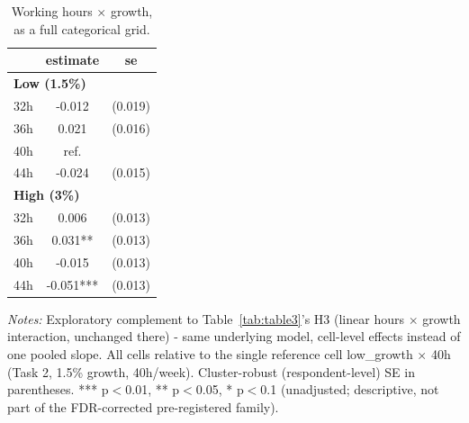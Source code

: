 \begin{table}[H]
    \centering
    \caption{Working hours $\times$ growth, as a full categorical grid.}
    \begin{tabular}{ l c c }
\hline \hline
 & estimate & se \\
\hline
\multicolumn{3}{l}{\textbf{Low (1.5\%)}} \\
\hspace{0.05cm} 32h & -0.012 & (0.019) \\
\hspace{0.05cm} 36h & 0.021 & (0.016) \\
\hspace{0.05cm} 40h & ref. &  \\
\hspace{0.05cm} 44h & -0.024 & (0.015) \\
\hline
\multicolumn{3}{l}{\textbf{High (3\%)}} \\
\hspace{0.05cm} 32h & 0.006 & (0.013) \\
\hspace{0.05cm} 36h & 0.031** & (0.013) \\
\hspace{0.05cm} 40h & -0.015 & (0.013) \\
\hspace{0.05cm} 44h & -0.051*** & (0.013) \\
\hline \hline
\end{tabular}
\begin{tablenotes}
\small
\item \textit{Notes:} Exploratory complement to Table~\ref{tab:table3}'s H3 (linear hours $\times$ growth interaction, unchanged there) - same underlying model, cell-level effects instead of one pooled slope. All cells relative to the single reference cell low\_growth $\times$ 40h (Task 2, 1.5\% growth, 40h/week). Cluster-robust (respondent-level) SE in parentheses. *** p$<$0.01, ** p$<$0.05, * p$<$0.1 (unadjusted; descriptive, not part of the FDR-corrected pre-registered family).
\end{tablenotes}
    \label{tab:table13}
\end{table}

